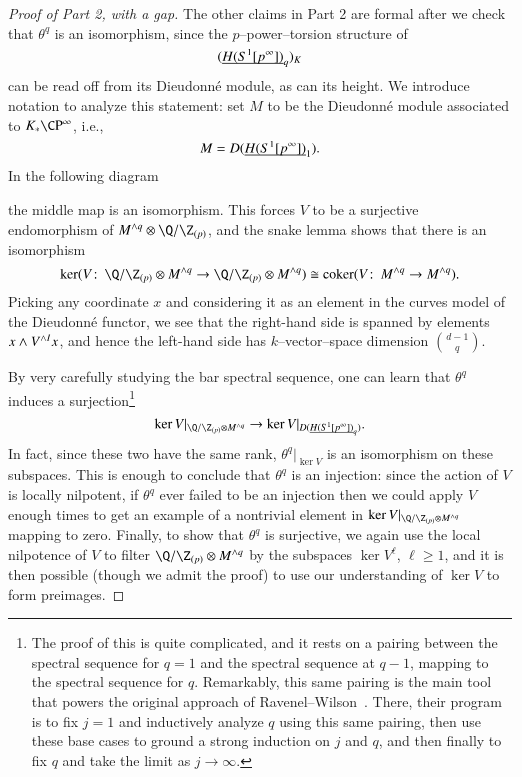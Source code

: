 \begin{proof}[Proof of Part 2, with a gap]\renewcommand{\qedsymbol}{\relax}
The other claims in Part 2 are formal after we check that $\theta^q$ is an isomorphism, since the $p$--power--torsion structure of \[(\underline{\smash{H(S^1[p^\infty])}}_{q})_K\] can be read off from its Dieudonn\'e module, as can its height.  We introduce notation to analyze this statement: set $M$ to be the Dieudonn\'e module associated to $K_* \CP^\infty$, i.e., \[M = D(\underline{\smash{H(S^1[p^\infty])}}_{1}).\]  In the following diagram
\begin{center}
\end{center}
the middle map is an isomorphism.  This forces $V$ to be a surjective endomorphism of $M^{\wedge q} \otimes \Q/\Z_{(p)}$, and the snake lemma shows that there is an isomorphism \[\ker(V\co \Q/\Z_{(p)} \otimes M^{\wedge q} \to \Q/\Z_{(p)} \otimes M^{\wedge q}) \cong \operatorname{coker}(V\co M^{\wedge q} \to M^{\wedge q}).\]  Picking any coordinate $x$ and considering it as an element in the curves model of the Dieudonn\'e functor, we see that the right-hand side is spanned by elements $x \wedge V^{\wedge I} x$, and hence the left-hand side has $k$--vector--space dimension $\binom{d-1}{q}$.

By very carefully studying the bar spectral sequence, one can learn that $\theta^q$ induces a surjection\footnote{The proof of this is quite complicated, and it rests on a pairing between the spectral sequence for $q = 1$ and the spectral sequence at $q - 1$, mapping to the spectral sequence for $q$.  Remarkably, this same pairing is the main tool that powers the original approach of  Ravenel--Wilson~\cite{RavenelWilsonKthyOfEMSpaces}.  There, their program is to fix $j = 1$ and inductively analyze $q$ using this same pairing, then use these base cases to ground a strong induction on $j$ and $q$, and then finally to fix $q$ and take the limit as $j \to \infty$.} \[\ker V|_{\Q / \Z_{(p)} \otimes M^{\wedge q}} \to \ker V|_{D(\OS{H(S^1[p^\infty])}{q})}.\]  In fact, since these two have the same rank, $\theta^q|_{\ker V}$ is an isomorphism on these subspaces.  This is enough to conclude that $\theta^q$ is an injection: since the action of $V$ is locally nilpotent, if $\theta^q$ ever failed to be an injection then we could apply $V$ enough times to get an example of a nontrivial element in $\ker V|_{\Q / \Z_{(p)} \otimes M^{\wedge q}}$ mapping to zero.  Finally, to show that $\theta^q$ is surjective, we again use the local nilpotence of $V$ to filter $\Q / \Z_{(p)} \otimes M^{\sm q}$ by the subspaces $\ker V^\ell$, $\ell \ge 1$, and it is then possible (though we admit the proof) to use our understanding of $\ker V$ to form preimages.
\end{proof}

